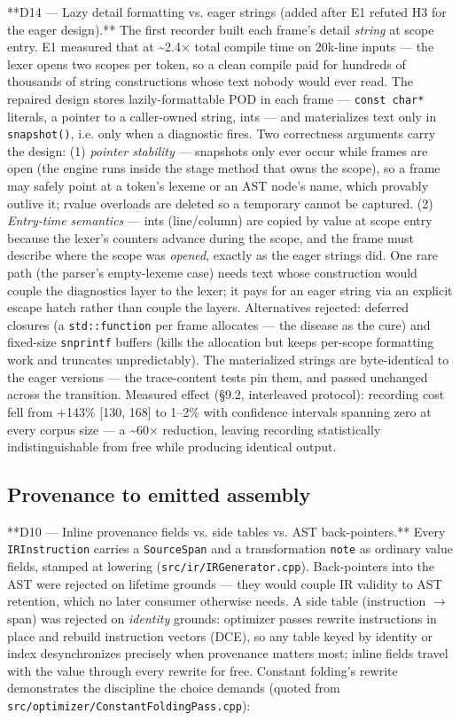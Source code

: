 **D14 --- Lazy detail formatting vs. eager strings (added after E1
refuted H3 for the eager design).** The first recorder built each
frame's detail \emph{string} at scope entry. E1 measured that at \textasciitilde{}2.4$\times$
total compile time on 20k-line inputs --- the lexer opens two scopes
per token, so a clean compile paid for hundreds of thousands of
string constructions whose text nobody would ever read. The repaired
design stores lazily-formattable POD in each frame --- \texttt{const char*}
literals, a pointer to a caller-owned string, ints --- and materializes
text only in \texttt{snapshot()}, i.e. only when a diagnostic fires. Two
correctness arguments carry the design: (1) \emph{pointer stability} ---
snapshots only ever occur while frames are open (the engine runs
inside the stage method that owns the scope), so a frame may safely
point at a token's lexeme or an AST node's name, which provably
outlive it; rvalue overloads are deleted so a temporary cannot be
captured. (2) \emph{Entry-time semantics} --- ints (line/column) are copied
by value at scope entry because the lexer's counters advance during
the scope, and the frame must describe where the scope was \emph{opened},
exactly as the eager strings did. One rare path (the parser's
empty-lexeme case) needs text whose construction would couple the
diagnostics layer to the lexer; it pays for an eager string via an
explicit escape hatch rather than couple the layers. Alternatives
rejected: deferred closures (a \texttt{std::function} per frame allocates ---
the disease as the cure) and fixed-size \texttt{snprintf} buffers (kills the
allocation but keeps per-scope formatting work and truncates
unpredictably). The materialized strings are byte-identical to the
eager versions --- the trace-content tests pin them, and passed
unchanged across the transition. Measured effect (\S9.2, interleaved
protocol): recording cost fell from +143\% [130, 168] to 1--2\% with
confidence intervals spanning zero at every corpus size --- a \textasciitilde{}60$\times$
reduction, leaving recording statistically indistinguishable from
free while producing identical output.

\subsection{Provenance to emitted assembly}

**D10 --- Inline provenance fields vs. side tables vs. AST
back-pointers.** Every \texttt{IRInstruction} carries a \texttt{SourceSpan} and a
transformation \texttt{note} as ordinary value fields, stamped at lowering
(\texttt{src/ir/IRGenerator.cpp}). Back-pointers into the AST were rejected
on lifetime grounds --- they would couple IR validity to AST retention,
which no later consumer otherwise needs. A side table (instruction $\rightarrow$
span) was rejected on \emph{identity} grounds: optimizer passes rewrite
instructions in place and rebuild instruction vectors (DCE), so any
table keyed by identity or index desynchronizes precisely when
provenance matters most; inline fields travel with the value through
every rewrite for free. Constant folding's rewrite demonstrates the
discipline the choice demands (quoted from
\texttt{src/optimizer/ConstantFoldingPass.cpp}):

